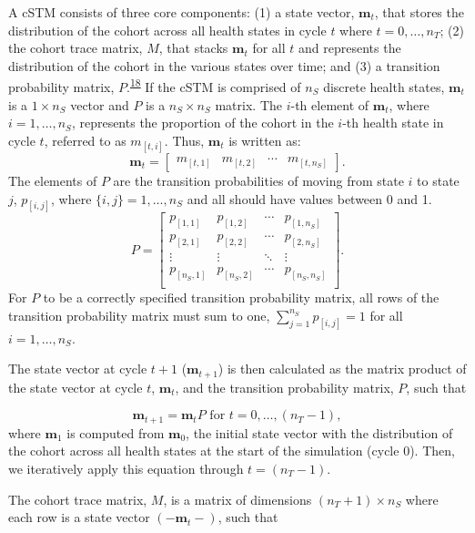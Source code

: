 \documentclass[
]{article}
\begin{document}
A cSTM consists of three core components: (1) a state vector, \(\mathbf{m}_t\), that stores the distribution of the cohort across all health states in cycle \(t\) where \(t = 0,\ldots, n_T\); (2) the cohort trace matrix, \(M\), that stacks \(\mathbf{m}_t\) for all \(t\) and represents the distribution of the cohort in the various states over time; and (3) a transition probability matrix, \(P\).\textsuperscript{\protect\hyperlink{ref-Iskandar2018a}{18}} If the cSTM is comprised of \(n_S\) discrete health states, \(\mathbf{m}_t\) is a \(1 \times n_S\) vector and \(P\) is a \(n_S \times n_S\) matrix. The \(i\)-th element of \(\mathbf{m}_t\), where \(i = 1,\ldots, n_S\), represents the proportion of the cohort in the \(i\)-th health state in cycle \(t\), referred to as \(m_{[t,i]}\). Thus, \(\mathbf{m}_t\) is written as:
\[
\mathbf{m}_t =
  \begin{bmatrix}
m_{[t,1]} & m_{[t,2]} & \cdots & m_{[t,n_S]}
\end{bmatrix}.
\]
The elements of \(P\) are the transition probabilities of moving from state \(i\) to state \(j\), \(p_{[i,j]}\), where \(\{i,j\} = 1,\ldots, n_S\) and all should have values between 0 and 1.
\[
  P = 
  \begin{bmatrix}
    p_{[1,1]} & p_{[1,2]} & \cdots & p_{[1,n_S]} \\
    p_{[2,1]} & p_{[2,2]} & \cdots & p_{[2,n_S]} \\
    \vdots    & \vdots  & \ddots & \vdots   \\
    p_{[n_S,1]} & p_{[n_S,2]} & \cdots & p_{[n_S,n_S]} \\
  \end{bmatrix}.
\]
For \(P\) to be a correctly specified transition probability matrix, all rows of the transition probability matrix must sum to one, \(\sum_{j=1}^{n_S}{p_{[i,j]}} = 1\) for all \(i = 1,\ldots,n_S\).

The state vector at cycle \(t+1\) (\(\mathbf{m}_{t+1}\)) is then calculated as the matrix product of the state vector at cycle \(t\), \(\mathbf{m}_{t}\), and the transition probability matrix, \(P\), such that

\[
  \mathbf{m}_{t+1} = \mathbf{m}_{t} P \text{ for } t = 0,\ldots, (n_T - 1),
\]
where \(\mathbf{m}_1\) is computed from \(\mathbf{m}_{0}\), the initial state vector with the distribution of the cohort across all health states at the start of the simulation (cycle 0). Then, we iteratively apply this equation through \(t = \left(n_T-1 \right)\).

The cohort trace matrix, \(M\), is a matrix of dimensions \((n_T+1) \times n_S\) where each row is a state vector \((-\mathbf{m}_{t}-)\), such that
\end{document}
